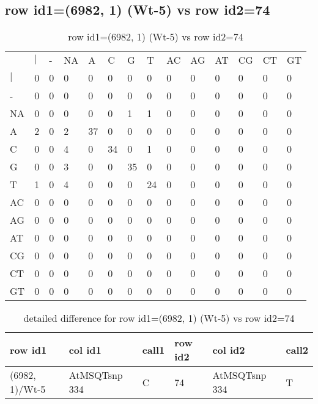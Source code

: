 \subsection{row id1=(6982, 1) (Wt-5) vs row id2=74}
\begin{center}
\begin{longtable}{|l|l|l|l|l|l|l|l|l|l|l|l|l|l|}
\caption{row id1=(6982, 1) (Wt-5) vs row id2=74} \label{table_dm212}\\
\hline
\\
\hline
&$|$&-&NA&A&C&G&T&AC&AG&AT&CG&CT&GT\\
$|$&0&0&0&0&0&0&0&0&0&0&0&0&0\\
-&0&0&0&0&0&0&0&0&0&0&0&0&0\\
NA&0&0&0&0&0&1&1&0&0&0&0&0&0\\
A&2&0&2&37&0&0&0&0&0&0&0&0&0\\
C&0&0&4&0&34&0&1&0&0&0&0&0&0\\
G&0&0&3&0&0&35&0&0&0&0&0&0&0\\
T&1&0&4&0&0&0&24&0&0&0&0&0&0\\
AC&0&0&0&0&0&0&0&0&0&0&0&0&0\\
AG&0&0&0&0&0&0&0&0&0&0&0&0&0\\
AT&0&0&0&0&0&0&0&0&0&0&0&0&0\\
CG&0&0&0&0&0&0&0&0&0&0&0&0&0\\
CT&0&0&0&0&0&0&0&0&0&0&0&0&0\\
GT&0&0&0&0&0&0&0&0&0&0&0&0&0\\
\hline
\end{longtable}
\end{center}

\begin{center}
\begin{longtable}{|l|l|l|l|l|l|}
\caption{detailed difference for row id1=(6982, 1) (Wt-5) vs row id2=74} \label{table_dm213}\\
\hline
row id1&col id1&call1&row id2&col id2&call2\\
\hline
(6982, 1)/Wt-5&AtMSQTsnp 334&C&74&AtMSQTsnp 334&T\\
\hline
\end{longtable}
\end{center}

